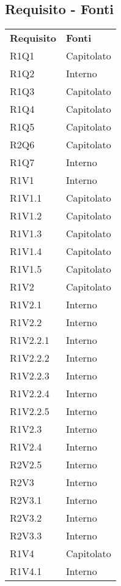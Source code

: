 	\subsection{Requisito - Fonti}
	\begin{longtable} {
			>{\centering}p{28mm}  
			>{}p{20mm}
		}
		\rowcolor{gray!50}
		\textbf{Requisito} & \textbf{Fonti}	\TBstrut \\
		R1Q1 & Capitolato \TBstrut \\ [2mm]
		R1Q2 & Interno \TBstrut \\ [2mm]
		R1Q3 & Capitolato \TBstrut \\ [2mm]
		R1Q4 & Capitolato \TBstrut \\ [2mm]
		R1Q5 & Capitolato \TBstrut \\ [2mm]
		R2Q6 & Capitolato \TBstrut \\ [2mm]
		R1Q7 & Interno \TBstrut \\ [2mm]
		R1V1 & Interno \TBstrut \\ [2mm]
		R1V1.1 & Capitolato \TBstrut \\ [2mm]
		R1V1.2 & Capitolato \TBstrut \\ [2mm]
		R1V1.3 & Capitolato \TBstrut \\ [2mm]
		R1V1.4 & Capitolato \TBstrut \\ [2mm]
		R1V1.5 & Capitolato \TBstrut \\ [2mm]
		R1V2 & Capitolato \TBstrut \\ [2mm]
		R1V2.1 & Interno \TBstrut \\ [2mm]
		R1V2.2 & Interno \TBstrut \\ [2mm]
		R1V2.2.1 & Interno \TBstrut \\ [2mm]
		R1V2.2.2 & Interno \TBstrut \\ [2mm]
		R1V2.2.3 & Interno \TBstrut \\ [2mm]
		R1V2.2.4 & Interno \TBstrut \\ [2mm]
		R1V2.2.5 & Interno \TBstrut \\ [2mm]
		R1V2.3 & Interno \TBstrut \\ [2mm]
		R1V2.4 & Interno \TBstrut \\ [2mm]
		R2V2.5 & Interno \TBstrut \\ [2mm]
		R2V3 & Interno \TBstrut \\ [2mm]
		R2V3.1 & Interno  \TBstrut \\ [2mm]		
		R2V3.2 & Interno  \TBstrut \\ [2mm]		
		R2V3.3 & Interno  \TBstrut \\ [2mm]		
		R1V4 & Capitolato  \TBstrut \\ [2mm]		
		R1V4.1 & Interno  \TBstrut \\ [2mm]
	\end{longtable}